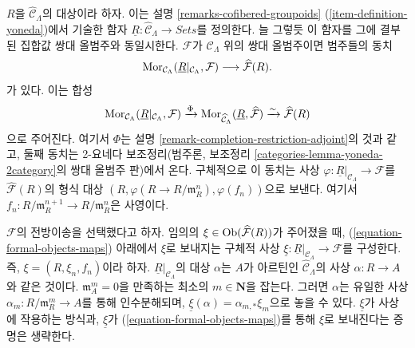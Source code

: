 \begin{remark}
\label{remark-formal-objects-yoneda}
$R$을 $\widehat{\mathcal{C}}_\Lambda$의 대상이라 하자. 이는 설명
\ref{remarks-cofibered-groupoids} (\ref{item-definition-yoneda})에서
기술한 함자 $\underline{R}: \widehat{\mathcal{C}}_\Lambda \to
\textit{Sets}$를 정의한다. 늘 그렇듯 이 함자를 그에 결부된 집합값
쌍대 올범주와 동일시한다. $\mathcal{F}$가 $\mathcal{C}_\Lambda$
위의 쌍대 올범주이면 범주들의 동치
\begin{equation}
\label{equation-formal-objects-maps}
\mathop{\mathrm{Mor}}\nolimits_{\mathcal{C}_\Lambda}(
\underline{R}|_{\mathcal{C}_\Lambda}, \mathcal{F})
\longrightarrow
\widehat{\mathcal{F}}(R).
\end{equation}
가 있다. 이는 합성
$$
\mathop{\mathrm{Mor}}\nolimits_{\mathcal{C}_\Lambda}(
\underline{R}|_{\mathcal{C}_\Lambda}, \mathcal{F})
\xrightarrow{\Phi}
\mathop{\mathrm{Mor}}\nolimits_{\widehat{\mathcal{C}}_\Lambda}(
\underline{R}, \widehat{\mathcal{F}})
\xrightarrow{\sim}
\widehat{\mathcal{F}}(R)
$$
으로 주어진다. 여기서 $\Phi$는 설명
\ref{remark-completion-restriction-adjoint}의 것과 같고, 둘째 동치는
2-요네다 보조정리(범주론, 보조정리
\ref{categories-lemma-yoneda-2category}의 쌍대 올범주 판)에서 온다.
구체적으로 이 동치는 사상
$\varphi : \underline{R}|_{\mathcal{C}_\Lambda} \to \mathcal{F}$를
$\widehat{\mathcal{F}}(R)$의 형식 대상
$(R, \varphi(R \to R/\mathfrak{m}_R^n), \varphi(f_n))$으로 보낸다.
여기서 $f_n : R/\mathfrak m_R^{n + 1} \to R/\mathfrak m_R^n$은
사영이다.

\medskip\noindent
$\mathcal{F}$의 전방이송을 선택했다고 하자. 임의의
$\xi \in \mathop{\mathrm{Ob}}\nolimits(\widehat{\mathcal{F}}(R))$가 주어졌을 때,
(\ref{equation-formal-objects-maps}) 아래에서 $\xi$로 보내지는 구체적 사상
$\underline{\xi} : \underline{R}|_{\mathcal{C}_\Lambda} \to \mathcal{F}$를
구성한다. 즉, $\xi = (R, \xi_n, f_n)$이라 하자.
$\underline{R}|_{\mathcal{C}_\Lambda}$의 대상 $\alpha$는
$A$가 아르틴인 $\widehat{\mathcal{C}}_\Lambda$의 사상
$\alpha : R \to A$와 같은 것이다. $\mathfrak m_A^m = 0$을 만족하는
최소의 $m \in \mathbf{N}$을 잡는다. 그러면 $\alpha$는 유일한 사상
$\alpha_m : R/\mathfrak m_R^m \to A$를 통해 인수분해되며,
$\underline{\xi}(\alpha) = \alpha_{m, *}\xi_m$으로 놓을 수 있다.
$\underline{\xi}$가 사상에 작용하는 방식과, $\underline{\xi}$가
(\ref{equation-formal-objects-maps})를 통해 $\xi$로 보내진다는 증명은
생략한다.


\end{remark}
